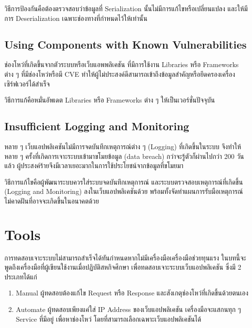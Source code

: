 วิธีการป้องกันคือต้องตรวจสอบว่าข้อมูลที่ Serialization นั้นไม่มีการแก้ไขหรือเปลี่ยนแปลง และให้มีการ Deserialization เฉพาะช่องทางที่กำหนดไว้ให้เท่านั้น

\subsection{Using Components with Known Vulnerabilities}

ช่องโหว่ที่เกิดขึ้นจากตัวระบบหรือเว็บแอพพลิเคชัน ที่มีการใช้งาน Libraries หรือ Frameworks ต่าง ๆ ที่มีช่องโหว่หรือมี CVE ทำให้ผู้ไม่ประสงค์ดีสามารถเข้าถึงข้อมูลสำคัญหรือยึดครองเครื่องเซิร์ฟเวอร์ได้สำเร็จ

วิธีการแก้คือหมั่นอัพเดต Libraries หรือ Frameworks ต่าง ๆ ให้เป็นเวอร์ชั่นปัจจุบัน

\subsection{Insufficient Logging and Monitoring}
หลาย ๆ เว็บแอปพลิเคชันไม่มีการจดบันทึกเหตุการณ์ต่าง ๆ (Logging) ที่เกิดขึ้นในระบบ จึงทำให้หลาย ๆ ครั้งที่เกิดการเจาะระบบเข้ามาขโมยข้อมูล (data breach) กว่าจะรู้ตัวก็ผ่านไปกว่า 200 วันแล้ว \cite{???} ผู้ประสงค์ร้ายจึงมีเวลาเยอะมากในการใช้ประโยชน์จากข้อมูลที่ขโมยมา

วิธีการแก้ไขคือผู้พัฒนาระบบควรใส่ระบบจดบันทึกเหตุการณ์ และระบบตรวจสอบเหตุการณ์ที่เกิดขึ้น (Logging and Monitoring) ลงในเว็บแอปพลิเคชันด้วย พร้อมทั้งจัดทำแผนการรับมือเหตุการณ์ไม่คาดฝันที่อาจจะเกิดขึ้นในอนาคตด้วย

\section{Tools}

การทดสอบเจาะระบบไม่สามารถสำเร็จได้ทันกำหนดหากไม่มีเครื่องมือเครื่องมือช่วยทุนแรง ในบทนี้จะพูดถึงเครื่องมือที่ผู้เขียนใช้งานเมื่อปฏิบัติสหกิจศึกษา เพื่อทดสอบเจาะระบบเว็บแอปพลิเคชัน ซึ่งมี 2 ประเภทได้แก่

\begin{enumerate}
	\item Manual ผู้ทดสอบต้องแก้ไข Request หรือ Response และสังเกตุช่องโหว่ที่เกิดขึ้นด้วยตนเอง 
	\item Automate ผู้ทดสอบเพียงแค่ใส่ IP Address ของเว็บแอปพลิเคชัน เครื่องมือจะแสกนทุก ๆ Service ที่มีอยู่ เพื่อหาช่องโหว่ โดยที่สามารถเลือกเฉพาะเว็บแอปพลิเคชันได้
\end{enumerate}


